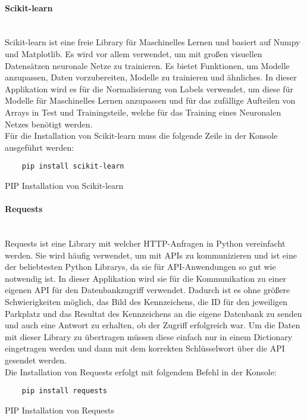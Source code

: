 \paragraph{Scikit-learn}\mbox{}\\
Scikit-learn ist eine freie Library für Maschinelles Lernen und basiert auf Numpy und Matplotlib. Es wird vor allem verwendet, 
um mit großen visuellen Datensätzen neuronale Netze zu trainieren.  Es bietet Funktionen, um Modelle anzupassen, Daten vorzubereiten, 
Modelle zu trainieren und ähnliches. In dieser Applikation wird es für die Normalisierung von Labels verwendet, um diese für Modelle für Maschinelles Lernen anzupassen und für das zufällige Aufteilen von Arrays in Test und Trainingsteile, welche für das Training eines Neuronalen Netzes benötigt werden.\\

Für die Installation von Scikit-learn muss die folgende Zeile in der Konsole ausgeführt werden:

\begin{listing}[H]
    \begin{verbatim}
    pip install scikit-learn
    \end{verbatim}
    \caption{PIP Installation von Scikit-learn}
\end{listing}

\paragraph{Requests}\mbox{}\\
Requests ist eine Library mit welcher HTTP-Anfragen in Python vereinfacht werden. Sie wird häufig verwendet, um mit APIs zu kommunizieren 
und ist eine der beliebtesten Python Librarys, da sie für API-Anwendungen so gut wie notwendig ist. In dieser Applikation wird sie für die 
Kommunikation zu einer eigenen API für den Datenbankzugriff verwendet. Dadurch ist es ohne größere Schwierigkeiten möglich, das Bild des Kennzeichens, 
die ID für den jeweiligen Parkplatz und das Resultat des Kennzeichens an die eigene Datenbank zu senden und auch eine Antwort zu erhalten, ob der 
Zugriff erfolgreich war. Um die Daten mit dieser Library zu übertragen müssen diese einfach nur in einem Dictionary eingetragen werden und dann mit 
dem korrekten Schlüsselwort über die API gesendet werden.\\

Die Installation von Requests erfolgt mit folgendem Befehl in der Konsole:

\begin{listing}[H]
    \begin{verbatim}
    pip install requests
    \end{verbatim}
    \caption{PIP Installation von Requests}
\end{listing}

